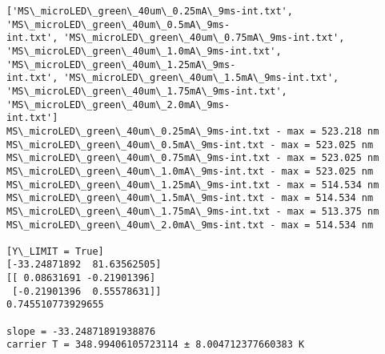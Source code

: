     \begin{Verbatim}[commandchars=\\\{\}]
['MS\_microLED\_green\_40um\_0.25mA\_9ms-int.txt', 'MS\_microLED\_green\_40um\_0.5mA\_9ms-
int.txt', 'MS\_microLED\_green\_40um\_0.75mA\_9ms-int.txt',
'MS\_microLED\_green\_40um\_1.0mA\_9ms-int.txt', 'MS\_microLED\_green\_40um\_1.25mA\_9ms-
int.txt', 'MS\_microLED\_green\_40um\_1.5mA\_9ms-int.txt',
'MS\_microLED\_green\_40um\_1.75mA\_9ms-int.txt', 'MS\_microLED\_green\_40um\_2.0mA\_9ms-
int.txt']
MS\_microLED\_green\_40um\_0.25mA\_9ms-int.txt - max = 523.218 nm
MS\_microLED\_green\_40um\_0.5mA\_9ms-int.txt - max = 523.025 nm
MS\_microLED\_green\_40um\_0.75mA\_9ms-int.txt - max = 523.025 nm
MS\_microLED\_green\_40um\_1.0mA\_9ms-int.txt - max = 523.025 nm
MS\_microLED\_green\_40um\_1.25mA\_9ms-int.txt - max = 514.534 nm
MS\_microLED\_green\_40um\_1.5mA\_9ms-int.txt - max = 514.534 nm
MS\_microLED\_green\_40um\_1.75mA\_9ms-int.txt - max = 513.375 nm
MS\_microLED\_green\_40um\_2.0mA\_9ms-int.txt - max = 514.534 nm

[Y\_LIMIT = True]
[-33.24871892  81.63562505]
[[ 0.08631691 -0.21901396]
 [-0.21901396  0.55578631]]
0.745510773929655

slope = -33.24871891938876
carrier T = 348.99406105723114 ± 8.004712377660383 K
    \end{Verbatim}

    \begin{center}
    \end{center}
    { \hspace*{\fill} \\}
    
    \begin{center}
    \end{center}
    { \hspace*{\fill} \\}
    
    \begin{tcolorbox}[breakable, size=fbox, boxrule=1pt, pad at break*=1mm,colback=cellbackground, colframe=cellborder]
\begin{Verbatim}[commandchars=\\\{\}]

\end{Verbatim}
\end{tcolorbox}


    
    
    


